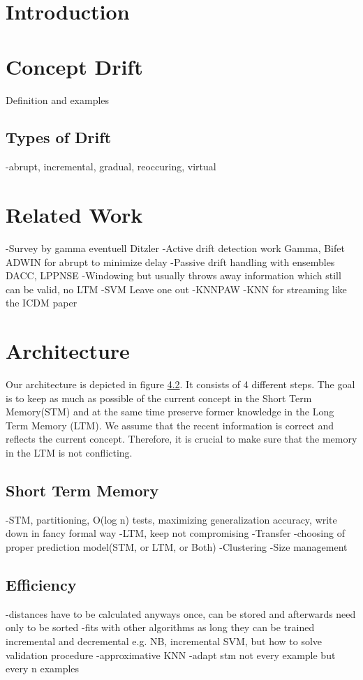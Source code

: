 \documentclass[conference]{IEEEtran}
\begin{document}
\IEEEpeerreviewmaketitle

\section{Introduction}
\section{Concept Drift}
Definition and examples
\subsection{Types of Drift}
-abrupt, incremental, gradual, reoccuring, virtual
\section{Related Work}\label{relatedWork}
-Survey by gamma eventuell Ditzler
-Active drift detection work Gamma, Bifet ADWIN for abrupt to minimize delay
-Passive drift handling with ensembles DACC, LPPNSE
-Windowing but usually throws away information which still can be valid, no LTM
  -SVM Leave one out
  -KNNPAW 
-KNN for streaming like the ICDM paper


\section{Architecture}\label{IncrementaLearningMethod}
Our architecture is depicted in figure \ref{}. It consists of 4 different steps. The goal is to keep as much as possible of the current concept in the Short Term Memory(STM) and at the same
time preserve former knowledge in the Long Term Memory (LTM). We assume that the recent information is correct and reflects the current concept. Therefore, it is crucial to make
sure that the memory in the LTM is not conflicting. 

\subsection{Short Term Memory}
-STM, partitioning, O(log n) tests, maximizing generalization accuracy, write down in fancy formal way
-LTM, keep not compromising
-Transfer
-choosing of proper prediction model(STM, or LTM, or Both)
-Clustering
-Size management

\subsection{Efficiency}
-distances have to be calculated anyways once, can be stored and afterwards need only to be sorted
-fits with other algorithms as long they can be trained incremental and decremental e.g. NB, incremental SVM, but how to solve validation procedure
-approximative KNN
-adapt stm not every example but every n examples
\end{document}
